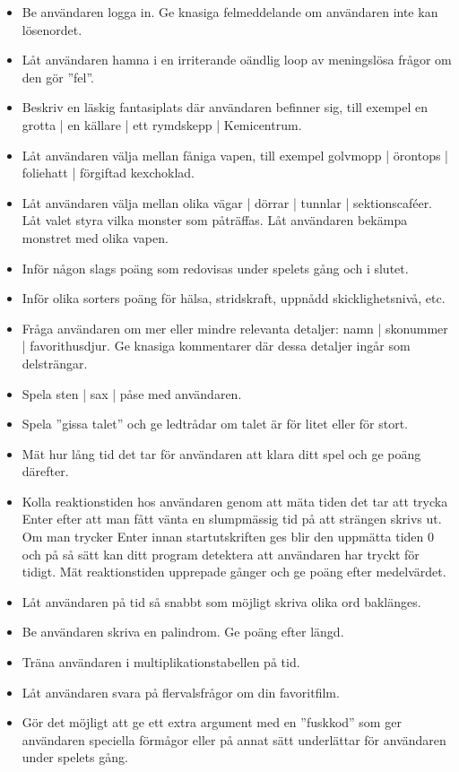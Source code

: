 \begin{itemize}
\item Be användaren logga in. Ge knasiga felmeddelande om användaren inte kan lösenordet.
\item Låt användaren hamna i en irriterande oändlig loop av meningslösa frågor om den gör ''fel''.
\item Beskriv en läskig fantasiplats där användaren befinner sig, till exempel en grotta | en källare | ett rymdskepp | Kemicentrum.
\item Låt användaren välja mellan fåniga vapen, till exempel golvmopp | örontops | foliehatt | förgiftad kexchoklad.
\item Låt användaren välja mellan olika vägar | dörrar | tunnlar | sektionscaféer. Låt valet styra vilka monster som påträffas. Låt användaren bekämpa monstret med olika vapen.
\item Inför någon slags poäng som redovisas under spelets gång och i slutet.
\item Inför olika sorters poäng för hälsa, stridskraft, uppnådd skicklighetsnivå, etc.
\item Fråga användaren om mer eller mindre relevanta detaljer: namn | skonummer | favorithusdjur. Ge knasiga kommentarer där dessa detaljer ingår som delsträngar.
\item Spela sten | sax | påse med användaren.
\item Spela ''gissa talet'' och ge ledtrådar om talet är för litet eller för stort.
\item Mät hur lång tid det tar för användaren att klara ditt spel och ge poäng därefter.
\item Kolla reaktionstiden hos användaren genom att mäta tiden det tar att trycka Enter efter att man fått vänta en slumpmässig tid på att strängen  skrivs ut. Om man trycker Enter innan startutskriften ges blir den uppmätta tiden 0 och på så sätt kan ditt program detektera att användaren har tryckt för tidigt. Mät reaktionstiden upprepade gånger och ge poäng efter medelvärdet.
\item Låt användaren på tid så snabbt som möjligt skriva olika ord baklänges.
\item Be användaren skriva en palindrom. Ge poäng efter längd.
\item Träna användaren i multiplikationstabellen på tid.
\item Låt användaren svara på flervalsfrågor om din favoritfilm.
\item Gör det möjligt att ge ett extra argument med en ''fuskkod'' som ger användaren speciella förmågor eller på annat sätt underlättar för användaren under spelets gång.
\end{itemize}

